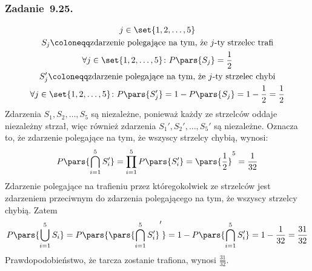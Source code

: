 \subsubsection*{Zadanie~9.25.}
\begin{gather*}
    j \in \set{1, 2, \ldots, 5}\\
    S_j \coloneqq \text{zdarzenie polegające na tym, że \(j\)-ty strzelec trafi}\\
    \forall j \in \set{1, 2, \ldots, 5}\colon P\pars{S_j} = \frac{1}{2}\\
    S_j' \coloneqq \text{zdarzenie polegające na tym, że \(j\)-ty strzelec chybi}\\
    \forall j \in \set{1, 2, \ldots, 5}\colon P\pars{S_j'} = 1 - P\pars{S_j} = 1 - \frac{1}{2} = \frac{1}{2}
\end{gather*}
Zdarzenia \(S_1, S_2, \ldots, S_5\) są niezależne, ponieważ każdy ze strzelców oddaje niezależny strzał, więc również zdarzenia \(S_1', S_2', \ldots, S_5'\) są niezależne. Oznacza to, że zdarzenie polegające na tym, że wszyscy strzelcy chybią, wynosi:
\begin{equation*}
    P\pars{\bigcap_{i = 1}^{5} S_i'}
        = \prod_{i = 1}^{5} P\pars{S_i'}
        = \pars{\frac{1}{2}}^5
        = \frac{1}{32}
\end{equation*}
Zdarzenie polegające na trafieniu przez któregokolwiek ze strzelców jest zdarzeniem przeciwnym do zdarzenia polegającego na tym, że wszyscy strzelcy chybią. Zatem
\begin{equation*}
    P\pars{\bigcup_{i = 1}^{5} S_i} = P\pars{\pars{\bigcap_{i = 1}^{5} S_i'}'} = 1 - P\pars{\bigcap_{i = 1}^{5} S_i'} = 1 - \frac{1}{32} = \frac{31}{32}
\end{equation*}
Prawdopodobieństwo, że tarcza zostanie trafiona, wynosi \(\frac{31}{32}\).
